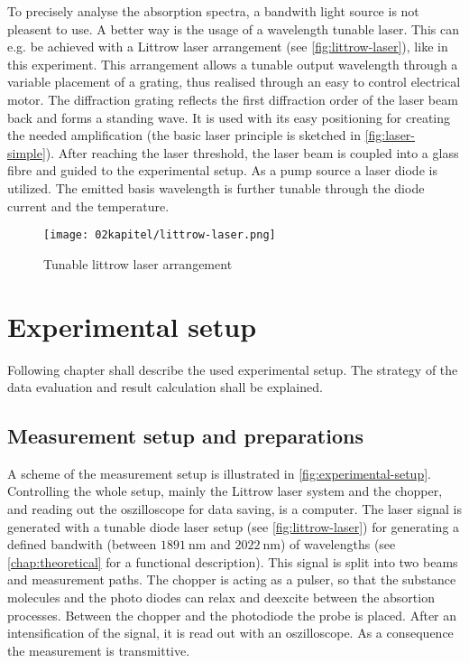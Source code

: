 To precisely analyse the absorption spectra, a bandwith light source is not pleasent to use. A better way is the usage of a wavelength tunable laser. This can e.g. be achieved with a Littrow laser arrangement (see \autoref{fig:littrow-laser}), like in this experiment. This arrangement allows a tunable output wavelength through a variable placement of a grating, thus realised through an easy to control electrical motor. The diffraction grating reflects the first diffraction order of the laser beam back and forms a standing wave. It is used with its easy positioning for creating the needed amplification (the basic laser principle is sketched in \autoref{fig:laser-simple}). After reaching the laser threshold, the laser beam is coupled into a glass fibre and guided to the experimental setup. As a pump source a laser diode is utilized. The emitted basis wavelength is further tunable through the diode current and the temperature.

\begin{figure}[!htb]
    \centering
    \texttt{[image: 02kapitel/littrow-laser.png]}
    \caption[Tunable littrow laser arrangement]{Tunable littrow laser arrangement \autocite{klevanskyTDLASTunableLaser2021}}
    \label{fig:littrow-laser}
\end{figure}

\chapter{Experimental setup}
\label{chap:experimental}

Following chapter shall describe the used experimental setup. The strategy of the data evaluation and result calculation shall be explained.

\section{Measurement setup and preparations}
\label{sec:setup}

A scheme of the measurement setup is illustrated in \autoref{fig:experimental-setup}. Controlling the whole setup, mainly the Littrow laser system and the chopper, and reading out the oszilloscope for data saving, is a computer. The laser signal is generated with a tunable diode laser setup (see \autoref{fig:littrow-laser}) for generating a defined bandwith (between $1891~\mathrm{nm}$ and $2022~\mathrm{nm}$) of wavelengths (see \autoref{chap:theoretical} for a functional description). This signal is split into two beams and measurement paths. The chopper is acting as a pulser, so that the substance molecules and the photo diodes can relax and deexcite between the absortion processes. Between the chopper and the photodiode the probe is placed. After an intensification of the signal, it is read out with an oszilloscope. As a consequence the measurement is transmittive. 

